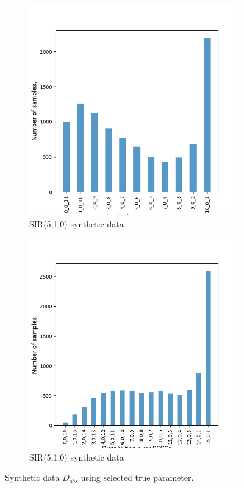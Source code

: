 \begin{figure}[H]
\begin{subfigure}{0.3\textwidth}
        \includegraphics[width=\linewidth]{figures/sir1010_data.png}
        \caption{SIR(5,1,0) synthetic data}
    \end{subfigure}
    \hfill
    \begin{subfigure}{0.3\textwidth}
        \centering
        \includegraphics[width=\linewidth]{figures/sir1510_data.png}
        \caption{SIR(5,1,0) synthetic data}
    \end{subfigure}
    \caption{Synthetic data $D_{obs}$ using selected true parameter.}
\end{figure}

